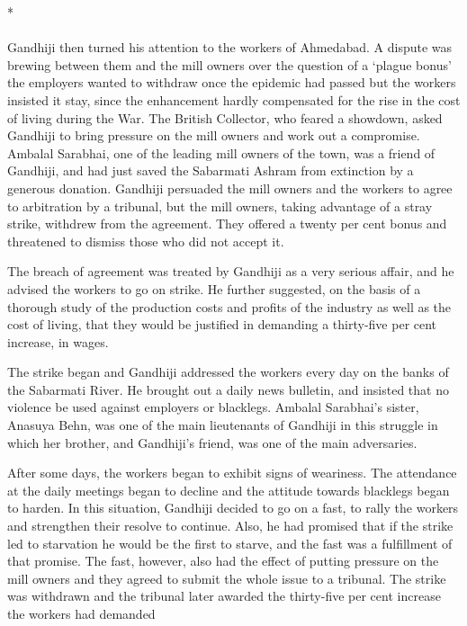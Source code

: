 \begin{multicols}{2}
\begin{center}*\end{center}

\paragraph*{}

Gandhiji then turned his attention to the workers of Ahmedabad. A dispute was brewing between them and the mill owners over the question of a `plague bonus' the employers wanted to withdraw once the epidemic had passed but the workers insisted it stay, since the enhancement hardly compensated for the rise in the cost of living during the War. The British Collector, who feared a showdown, asked Gandhiji to bring pressure on the mill owners and work out a compromise. Ambalal Sarabhai, one of the leading mill owners of the town, was a friend of Gandhiji, and had just saved the Sabarmati Ashram from extinction by a generous donation. Gandhiji persuaded the mill owners and the workers to agree to arbitration by a tribunal, but the mill owners, taking advantage of a stray strike, withdrew from the agreement. They offered a twenty per cent bonus and threatened to dismiss those who did not accept it.

The breach of agreement was treated by Gandhiji as a very serious affair, and he advised the workers to go on strike. He further suggested, on the basis of a thorough study of the production costs and profits of the industry as well as the cost of living, that they would be justified in demanding a thirty-five per cent increase, in wages.

The strike began and Gandhiji addressed the workers every day on the banks of the Sabarmati River. He brought out a daily news bulletin, and insisted that no violence be used against employers or blacklegs. Ambalal Sarabhai's sister, Anasuya Behn, was one of the main lieutenants of Gandhiji in this struggle in which her brother, and Gandhiji's friend, was one of the main adversaries.

After some days, the workers began to exhibit signs of weariness. The attendance at the daily meetings began to decline and the attitude towards blacklegs began to harden. In this situation, Gandhiji decided to go on a fast, to rally the workers and strengthen their resolve to continue. Also, he had promised that if the strike led to starvation he would be the first to starve, and the fast was a fulfillment of that promise. The fast, however, also had the effect of putting pressure on the mill owners and they agreed to submit the whole issue to a tribunal. The strike was withdrawn and the tribunal later awarded the thirty-five per cent increase the workers had demanded


\end{multicols}
